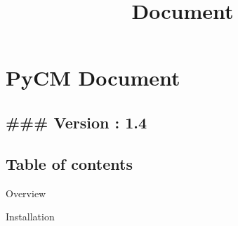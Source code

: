\documentclass[11pt]{article}
\title{Document}
\begin{document}
    
    
    \maketitle
    
    

    
    \hypertarget{pycm-document}{%
\section{PyCM Document}\label{pycm-document}}

    \hypertarget{version-1.4}{%
\subsection{\#\#\# Version : 1.4}\label{version-1.4}}

    \hypertarget{table-of-contents}{%
\subsection{Table of contents}\label{table-of-contents}}

    Overview

Installation
\end{document}
